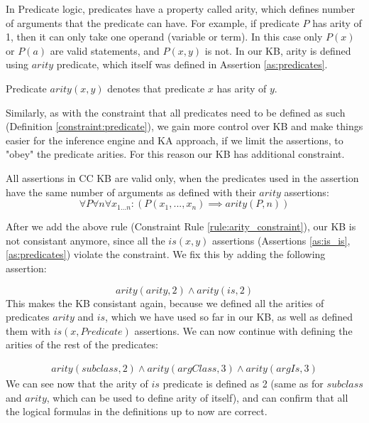 In Predicate logic, predicates have a property called arity, which defines 
number of arguments that the predicate can have. For example, if predicate
$P$ has arity of 1, then it can only take one operand (variable or term). In 
this case only $P(x)$ or $P(a)$ are valid statements, and $P(x,y)$ is not.
In our KB, arity is defined using $arity$ predicate, which itself was defined
in Assertion \ref{as:predicates}.

\begin{definition}\label{def:arity}
Predicate $arity(x,y)$ denotes that predicate $x$ has arity of $y$.
\end{definition}

Similarly, as with the constraint that all predicates need to be defined as
such (Definition \autoref{constraint:predicate}), we gain more control over 
KB and make things easier for the inference engine and KA approach, if we 
limit the assertions, to "obey" the predicate arities. For this reason our KB
has additional constraint.

\begin{definition}\label{constraint:arity}
All assertions in CC KB are valid only, when the predicates used in the 
assertion have the same number of arguments as defined with their $arity$ 
assertions:
\begin{equation}\label{rule:arity_constraint}
\forall P \forall n \forall x_{1...n}:(P(x_1,...,x_n) \implies arity(P,n))
\end{equation}
\end{definition}

After we add the above rule (Constraint Rule \ref{rule:arity_constraint}), our 
KB is not consistant anymore, since all the $is(x,y)$ assertions (Assertions 
\ref{as:is_is}, \ref{as:predicates}) violate the constraint. We fix this by 
adding the following assertion:

\begin{equation}\label{as:arity_is}
arity(arity,2) \land arity(is,2)
\end{equation}
This makes the KB consistant again, because we defined all the arities of
predicates $arity$ and $is$, which we have used so far in our KB, as well as 
defined them with $is(x, Predicate)$ assertions. We can now continue with 
defining the arities of the rest of the predicates:

\begin{equation}\label{as:arity_predicates}
\begin{gathered}
arity(subclass, 2) \land arity(argClass,3) \land arity(argIs,3)
\end {gathered}
\end{equation}
We can see now that the arity of $is$ predicate is defined as 2 (same as for 
$subclass$ and $arity$, which can be used to define arity of itself), and can 
confirm that all the logical formulas in the definitions up to now are correct.

